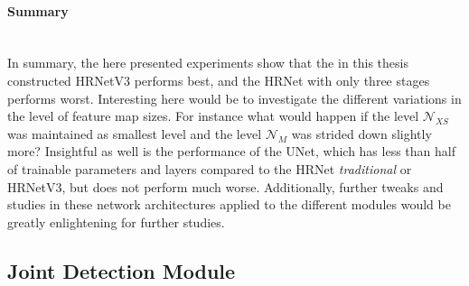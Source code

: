 \paragraph{Summary}\mbox{}\\
In summary, the here presented experiments show that the in this thesis constructed HRNetV3 performs best, and the HRNet
with only three stages performs
worst.
Interesting here would be to investigate the different variations in the level of feature map sizes.
For instance what would happen if the level $\mathcal{N}_{XS}$ was maintained as smallest level and the level
$\mathcal{N}_M$ was strided down slightly more?
Insightful as well is the performance of the UNet, which has less than half of trainable parameters and layers compared to
the HRNet \textit{traditional} or HRNetV3, but does not perform much worse.
Additionally, further tweaks and studies in these network architectures applied to the different modules would be
greatly enlightening for further studies.


\subsection{Joint Detection Module }

